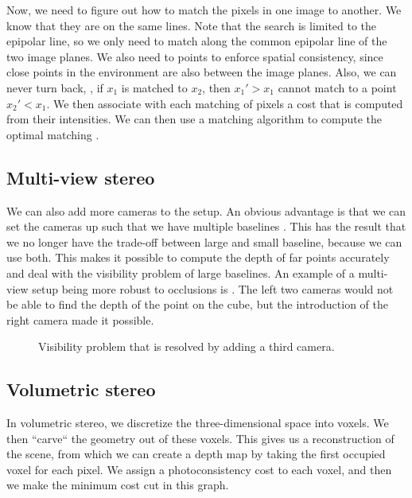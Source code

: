 Now, we need to figure out how to match the pixels in one image to another. We
know that they are on the same lines. Note that the search is limited to the
epipolar line, so we only need to match along the common epipolar line of the
two image planes. We also need to points to enforce spatial consistency, since
close points in the environment are also between the image planes. Also, we can
never turn back, \ie, if $x_1$ is matched to $x_2$, then $x_1' > x_1$ cannot
match to a point $x_2' < x_1$. We then associate with each matching of pixels a
cost that is computed from their intensities. We can then use a matching
algorithm to compute the optimal matching \citep{baker1981depth}.

\subsection{Multi-view stereo}

We can also add more cameras to the setup. An obvious advantage is that we can
set the cameras up such that we have multiple baselines
\citep{okutomi1993multiple}. This has the result that we no longer have the
trade-off between large and small baseline, because we can use both. This makes
it possible to compute the depth of far points accurately and deal with the
visibility problem of large baselines. An example of a multi-view setup being
more robust to occlusions is . The left two
cameras would not be able to find the depth of the point on the cube, but the
introduction of the right camera made it possible.

\begin{figure}
    \centering
    \caption{Visibility problem that is resolved by adding a third camera.}
    \label{fig:visibility-problem}
\end{figure}

\subsection{Volumetric stereo}

In volumetric stereo, we discretize the three-dimensional space into
voxels. We then ``carve``
the geometry out of these voxels. This gives us a reconstruction of the scene,
from which we can create a depth map by taking the first occupied voxel for
each pixel. We assign a photoconsistency cost to each voxel, and then we make
the minimum cost cut in this graph.

